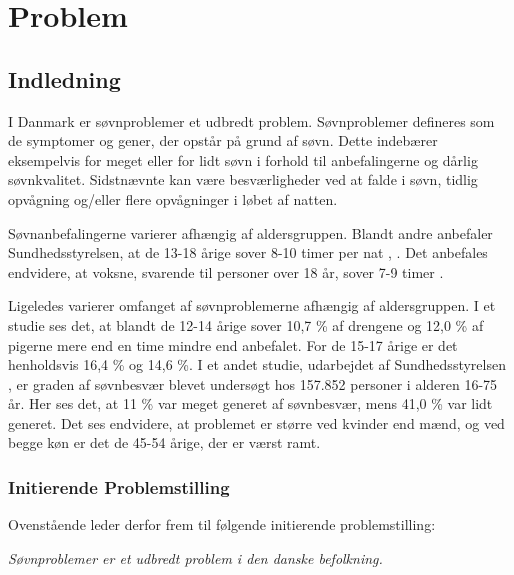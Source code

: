 \part{Problem}

\chapter{Indledning}

I Danmark er søvnproblemer et udbredt problem. Søvnproblemer defineres som de symptomer og gener, der opstår på grund af søvn. Dette indebærer eksempelvis for meget eller for lidt søvn i forhold til anbefalingerne og dårlig søvnkvalitet. Sidstnævnte kan være besværligheder ved at falde i søvn, tidlig opvågning og/eller flere opvågninger i løbet af natten.\cite[kap. 1]{Jennum2015} 

Søvnanbefalingerne varierer afhængig af aldersgruppen. Blandt andre anbefaler Sundhedsstyrelsen, at de 13-18 årige sover 8-10 timer per nat \cite[kap. 7]{Sundhedsstyrrelsen2011}, \cite{Hirshkowitz2015}. Det anbefales endvidere, at voksne, svarende til personer over 18 år, sover 7-9 timer \cite{Jennum2015, Hirshkowitz2015}. 

Ligeledes varierer omfanget af søvnproblemerne afhængig af aldersgruppen. I et studie ses det, at blandt de 12-14 årige sover 10,7 \% af drengene og 12,0 \% af pigerne mere end en time mindre end anbefalet. For de 15-17 årige er det henholdsvis 16,4 \% og 14,6 \%.\cite[kap. 5]{Bonke2013}  I et andet studie, udarbejdet af Sundhedsstyrelsen  \cite{Christensen2014}, er graden af søvnbesvær blevet undersøgt hos 157.852 personer i alderen 16-75 år. Her ses det, at 11 \% var meget generet af søvnbesvær, mens 41,0 \% var lidt generet. Det ses endvidere, at problemet er større ved kvinder end mænd, og ved begge køn er det de 45-54 årige, der er værst ramt. \cite[kap. 3]{Christensen2014}


\section{Initierende Problemstilling}

Ovenstående leder derfor frem til følgende initierende problemstilling:
\begin{center}
\textit{Søvnproblemer er et udbredt problem i den danske befolkning.}
\end{center}


